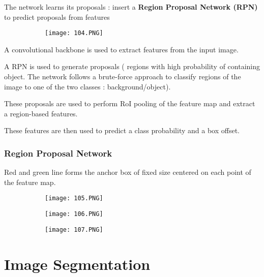 \documentclass{article}
\begin{document}
The network learns its proposals : insert a \textbf{Region Proposal Network (RPN)} to predict proposals from features

\begin{figure}[ht!]
  \centering
  \begin{subfigure}[b]{0.7\linewidth}
    \texttt{[image: 104.PNG]}
  \end{subfigure}
\end{figure}

A convolutional backbone is used to extract features from the input image.

A RPN is used to generate proposals ( regions with high probability of containing object. The network follows a brute-force approach to classify regions of the image to one of the two classes : background/object).

These proposals are used to perform RoI pooling of the feature map and extract a region-based features.

These features are then used to predict a class probability and a box offset.

\subsubsection{Region Proposal Network}

Red and green line forms the anchor box of fixed size centered on each point of the feature map.

\begin{figure}[ht!]
  \centering
  \begin{subfigure}[b]{0.8\linewidth}
    \texttt{[image: 105.PNG]}
  \end{subfigure}
\end{figure}

\begin{figure}[ht!]
  \centering
  \begin{subfigure}[b]{0.8\linewidth}
    \texttt{[image: 106.PNG]}
  \end{subfigure}
\end{figure}

\begin{figure}[ht!]
  \centering
  \begin{subfigure}[b]{0.8\linewidth}
    \texttt{[image: 107.PNG]}
  \end{subfigure}
\end{figure}

\section{Image Segmentation}
\end{document}
